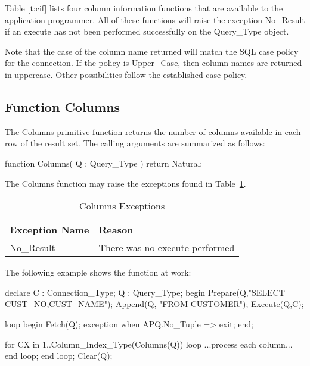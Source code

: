 \documentclass[english,letterpaper]{book}
\begin{document}
Table \ref{t:cif}
lists four column information functions that are available to the
application programmer.
All of these functions will raise the exception No\_Result
if an execute has not been performed successfully on the Query\_Type
object.

Note that the case of the column name returned will match the SQL
case policy for the connection. If the policy is Upper\_Case, then
column names are returned in uppercase. Other possibilities follow
the established case policy.


\subsection{Function Columns}

The Columns primitive function returns the number of columns
available in each row of the result set. The calling arguments are
summarized as follows:

\begin{Code}
function Columns(
   Q : Query_Type
) return Natural;
\end{Code}

The Columns function may raise the exceptions found in
Table~\ref{t:cex}.

\begin{table}
   \begin{center}
      \begin{tabular}{ll}
         Exception Name    &  Reason\\
         \hline 
         No\_Result        &  There was no execute performed\\
      \end{tabular}
   \end{center}
   \caption{Columns Exceptions}\label{t:cex}
\end{table}

The following example shows the function at work:

\begin{Example}
declare
   C : Connection_Type;
   Q : Query_Type;
begin
   Prepare(Q,"SELECT CUST_NO,CUST_NAME");
   Append(Q, "FROM CUSTOMER");
   Execute(Q,C);

   loop
      begin
         Fetch(Q);
      exception
         when APQ.No_Tuple =>
            exit;
      end;

      for CX in 1..Column_Index_Type(Columns(Q)) loop
         ...process each column...
      end loop;
   end loop;
   Clear(Q);
\end{Example}
\end{document}
